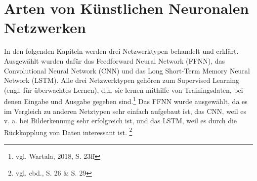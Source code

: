 \documentclass[a4paper,12pt,ngerman,oneside]{scrreprt}	%
\begin{document}
		\section{Arten von Künstlichen Neuronalen Netzwerken}\label{Arten}
		In den folgenden Kapiteln werden drei Netzwerktypen behandelt und erklärt. Ausgewählt wurden dafür das Feedforward Neural Network (FFNN), das Convolutional Neural Network (CNN) und das Long Short-Term Memory Neural Network (LSTM). Alle drei Netzwerktypen gehören zum Supervised Learning (engl. für überwachtes Lernen), d.h. sie lernen mithilfe von Trainingsdaten, bei denen Eingabe und Ausgabe gegeben sind.\footnote{vgl. Wartala, 2018, S. 23ff} Das FFNN wurde ausgewählt, da es im Vergleich zu anderen Netztypen sehr einfach aufgebaut ist, das CNN, weil es v. a. bei Bilderkennung sehr erfolgreich ist, und das LSTM, weil es durch die Rückkopplung von Daten interessant ist. \footnote{vgl. ebd., S. 26 \& S. 29}
		
		
\end{document}
